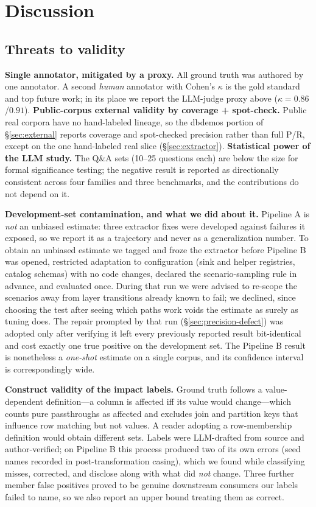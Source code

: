 \documentclass[11pt]{article}
\begin{document}
\section{Discussion}

\subsection{Threats to validity}
\textbf{Single annotator, mitigated by a proxy.} All ground truth was authored by
one annotator. A second \emph{human} annotator with Cohen's $\kappa$ is the gold
standard and top future work; in its place we report the LLM-judge proxy above
($\kappa=0.86$/$0.91$). \textbf{Public-corpus external validity by coverage + spot-check.} Public real
corpora have no hand-labeled lineage, so the dbdemos portion of
\S\ref{sec:external} reports coverage and spot-checked precision rather than full
P/R, except on the one hand-labeled real slice (\S\ref{sec:extractor}).
\textbf{Statistical power of the LLM study.} The Q\&A sets (10--25 questions each)
are below the size for formal significance testing; the negative result is reported
as directionally consistent across four families and three benchmarks, and the
contributions do not depend on it.

\textbf{Development-set contamination, and what we did about it.} Pipeline A
is \emph{not} an unbiased estimate: three extractor fixes were developed
against failures it exposed, so we report it as a trajectory and never as a
generalization number. To obtain an unbiased estimate we tagged and froze the
extractor before Pipeline B was opened, restricted adaptation to
configuration (sink and helper registries, catalog schemas) with no code changes,
declared the scenario-sampling rule in advance, and evaluated once. During that run
we were advised to re-scope the scenarios away from layer transitions already known
to fail; we declined, since choosing the test after seeing which paths work voids
the estimate as surely as tuning does. The repair prompted by that run
(\S\ref{sec:precision-defect}) was adopted only after verifying it left every
previously reported result bit-identical and cost exactly one true positive on the
development set. The Pipeline B result is nonetheless a \emph{one-shot} estimate on a
single corpus, and its confidence interval is correspondingly wide.

\textbf{Construct validity of the impact labels.} Ground truth follows a
value-dependent definition---a column is affected iff its value would
change---which counts pure passthroughs as affected and excludes join and partition
keys that influence row matching but not values. A reader adopting a
row-membership definition would obtain different sets. Labels were LLM-drafted from
source and author-verified; on Pipeline B this process produced two of its
own errors (seed names recorded in post-transformation casing), which we found while
classifying misses, corrected, and disclose along with what did \emph{not} change.
Three further member false positives proved to be genuine downstream consumers our
labels failed to name, so we also report an upper bound treating them as correct.
\end{document}
